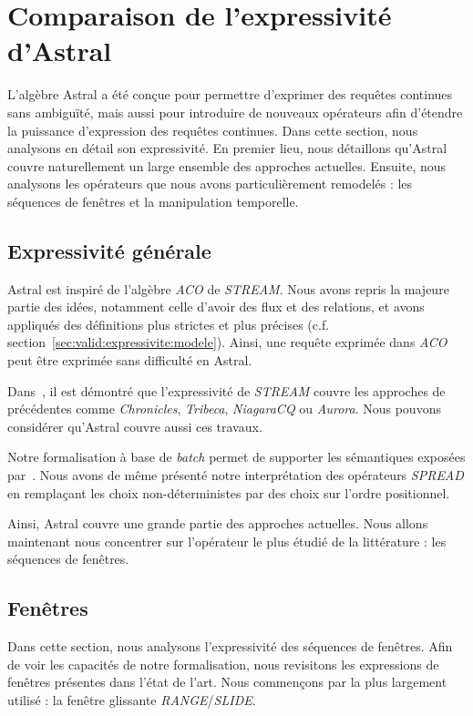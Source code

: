 \section{Comparaison de l'expressivité d'Astral}\label{sec:valid:expressivite:comparaison}
L'algèbre Astral a été conçue pour permettre d'exprimer des requêtes continues sans ambiguïté, mais aussi pour introduire de nouveaux opérateurs afin d'étendre la puissance d'expression des requêtes continues. Dans cette section, nous analysons en détail son expressivité. En premier lieu, nous détaillons qu'Astral couvre naturellement un large ensemble des approches actuelles. Ensuite, nous analysons les opérateurs que nous avons particulièrement remodelés : les séquences de fenêtres et la manipulation temporelle.

\subsection{Expressivité générale}
Astral est inspiré de l'algèbre \textit{ACO} de \textit{STREAM}. Nous avons repris la majeure partie des idées, notamment celle d'avoir des flux et des relations, et avons appliqués des définitions plus strictes et plus précises (c.f. section~\ref{sec:valid:expressivite:modele}). Ainsi, une requête exprimée dans \textit{ACO} peut être exprimée sans difficulté en Astral.

Dans~\cite{Arasu:stream}, il est démontré que l'expressivité de \textit{STREAM} couvre les approches de précédentes comme \textit{Chronicles}, \textit{Tribeca}, \textit{NiagaraCQ} ou \textit{Aurora}. Nous pouvons considérer qu'Astral couvre aussi ces travaux.

Notre formalisation à base de \textit{batch} permet de supporter les sémantiques exposées par~\cite{Jain:spread}. Nous avons de même présenté notre interprétation des opérateurs \textit{SPREAD} en remplaçant les choix non-déterministes par des choix sur l'ordre positionnel.

Ainsi, Astral couvre une grande partie des approches actuelles. Nous allons maintenant nous concentrer sur l'opérateur le plus étudié de la littérature : les séquences de fenêtres.

\subsection{Fenêtres}
Dans cette section, nous analysons l'expressivité des séquences de fenêtres. Afin de voir les capacités de notre formalisation, nous revisitons les expressions de fenêtres présentes dans l'état de l'art. Nous commençons par la plus largement utilisé : la fenêtre glissante \textit{RANGE}/\textit{SLIDE}.
